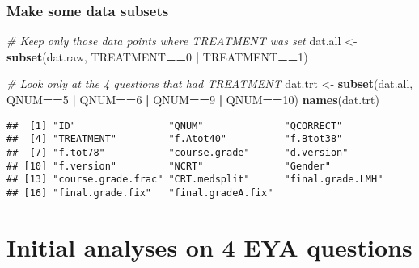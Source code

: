 \documentclass[]{article}
\newenvironment{Shaded}{\begin{snugshade}}{\end{snugshade}}
\newcommand{\KeywordTok}[1]{\textcolor[rgb]{0.13,0.29,0.53}{\textbf{#1}}}
\newcommand{\DecValTok}[1]{\textcolor[rgb]{0.00,0.00,0.81}{#1}}
\newcommand{\StringTok}[1]{\textcolor[rgb]{0.31,0.60,0.02}{#1}}
\newcommand{\CommentTok}[1]{\textcolor[rgb]{0.56,0.35,0.01}{\textit{#1}}}
\newcommand{\OperatorTok}[1]{\textcolor[rgb]{0.81,0.36,0.00}{\textbf{#1}}}
\newcommand{\NormalTok}[1]{#1}
\begin{document}
\begin{Shaded}
\end{Shaded}

\subsubsection{Make some data subsets}\label{make-some-data-subsets}

\begin{Shaded}
\begin{Highlighting}[]
\CommentTok{# Keep only those data points where TREATMENT was set}
\NormalTok{dat.all <-}\StringTok{ }\KeywordTok{subset}\NormalTok{(dat.raw, TREATMENT}\OperatorTok{==}\DecValTok{0} \OperatorTok{|}\StringTok{ }\NormalTok{TREATMENT}\OperatorTok{==}\DecValTok{1}\NormalTok{)}

\CommentTok{# Look only at the 4 questions that had TREATMENT}
\NormalTok{dat.trt <-}\StringTok{ }\KeywordTok{subset}\NormalTok{(dat.all, QNUM}\OperatorTok{==}\DecValTok{5} \OperatorTok{|}\StringTok{ }\NormalTok{QNUM}\OperatorTok{==}\DecValTok{6} \OperatorTok{|}\StringTok{ }\NormalTok{QNUM}\OperatorTok{==}\DecValTok{9} \OperatorTok{|}\StringTok{ }\NormalTok{QNUM}\OperatorTok{==}\DecValTok{10}\NormalTok{)}
\KeywordTok{names}\NormalTok{(dat.trt)}
\end{Highlighting}
\end{Shaded}

\begin{verbatim}
##  [1] "ID"                "QNUM"              "QCORRECT"         
##  [4] "TREATMENT"         "f.Atot40"          "f.Btot38"         
##  [7] "f.tot78"           "course.grade"      "d.version"        
## [10] "f.version"         "NCRT"              "Gender"           
## [13] "course.grade.frac" "CRT.medsplit"      "final.grade.LMH"  
## [16] "final.grade.fix"   "final.gradeA.fix"
\end{verbatim}

\section{Initial analyses on 4 EYA
questions}\label{initial-analyses-on-4-eya-questions}
\end{document}
